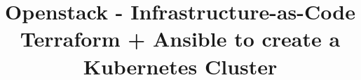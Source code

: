 \title{Openstack - Infrastructure-as-Code \\
	\large{Terraform + Ansible to create a Kubernetes Cluster}
}
